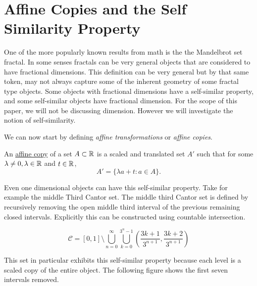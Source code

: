 \section{Affine Copies and the Self Similarity Property}


One of the more popularly known results from math is the the Mandelbrot set fractal.  In some senses fractals can be very general objects that are considered to have fractional dimensions.  This definition can be very general but by that same token, may not always capture some of the inherent geometry of some fractal type objects. Some objects with fractional dimensions have a self-similar property, and some self-similar objects have fractional dimension.  For the scope of this paper, we will not be discussing dimension. However we will investigate the notion of self-similarity. 

We can now start by defining \textit{affine transformations} or \textit{affine copies}.
\begin{definition}
    An \underline{affine copy} of a set $A \subset \mathbb{R}$ is a scaled and translated set $A'$ such that for some $\lambda\neq 0, \lambda \in \mathbb{R}$ and $t \in \mathbb{R}$,  $$A' = \{\lambda a + t : a \in A\}.$$
\end{definition}

Even one dimensional objects can have this self-similar property. Take for example the middle Third Cantor set.  The middle third Cantor set is defined by recursively removing the open middle third interval of the previous remaining closed intervals.  Explicitly this can be constructed using countable intersection.  

\begin{example}\label{middleThirdCantor}
    $$\mathcal{C} = [0,1] \setminus \bigcup_{n=0}^\infty\bigcup_{k=0}^{3^n-1}\left(\frac{3k+1}{3^{n+1}},\frac{3k+2}{3^{n+1}}\right)$$
\end{example}

This set in particular exhibits this self-similar property because each level is a scaled copy of the entire object.  The following figure shows the first seven intervals removed.  

